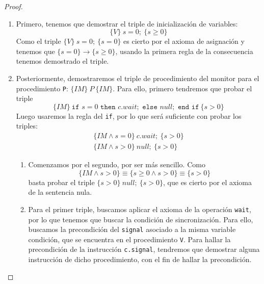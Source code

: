 \begin{ejemplo}
\begin{proof}
        \begin{enumerate}
            \item Primero, tenemos que demostrar el triple de inicialización de variables:
                \begin{equation*}
                    \{V\}\ s=0;\ \{s\geq 0\}
                \end{equation*}
                Como el triple $\{V\}\ s=0;\ \{s=0\}$ es cierto por el axioma de asignación y tenemos que $\{s=0\}\rightarrow\{s\geq 0\}$, usando la primera regla de la consecuencia tenemos demostrado el triple.
            \item Posteriormente, demostraremos el triple de procedimiento del monitor para el procedimiento \verb|P|: $\{IM\}\ P\ \{IM\}$. Para ello, primero tendremos que probar el triple
                \begin{equation*}
                    \{IM\}\ \texttt{if\ }s=0\texttt{\ then\ }c.wait;\texttt{\ else\ }null;\texttt{\ end if}\ \{s>0\}
                \end{equation*}
                Luego usaremos la regla del \verb|if|, por lo que será suficiente con probar los triples:
                \begin{gather*}
                    \{IM \land s=0\}\ c.wait;\ \{s>0\} \\
                    \{IM \land s>0\}\ null;\ \{s>0\}
                \end{gather*}
                \begin{enumerate}
                    \item Comenzamos por el segundo, por ser más sencillo. Como
                        \begin{equation*}
                            {\{IM \land s>0\} \equiv \{s\geq 0 \land s>0\}\equiv \{s>0\}}
                        \end{equation*}
                        basta probar el triple ${\{s>0\}\ null;\ \{s>0\}}$, que es cierto por el axioma de la sentencia nula.
                    \item Para el primer triple, buscamos aplicar el axioma de la operación \verb|wait|, por lo que tenemos que buscar la condición de sincronización. Para ello, buscamos la precondición del \verb|signal| asociado a la misma variable condición, que se encuentra en el procedimiento \verb|V|. Para hallar la precondición de la instrucción \verb|c.signal|, tendremos que demostrar alguna instrucción de dicho procedimiento, con el fin de hallar la precondición.


\end{enumerate}
\end{enumerate}
\end{proof}
\end{ejemplo}
